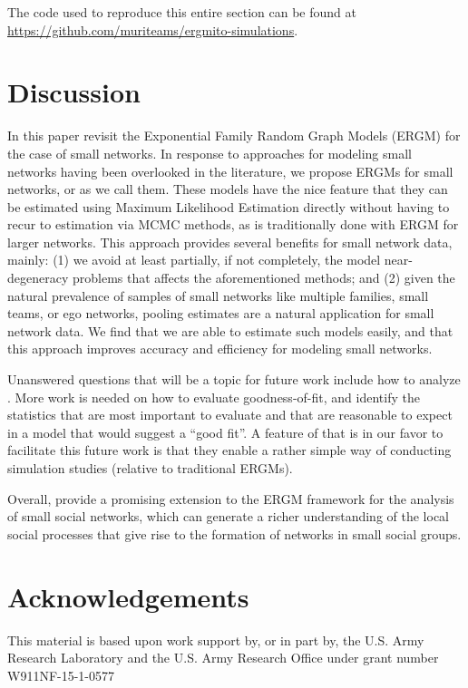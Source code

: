\documentclass[12pt]{article}
\begin{document}
The code used to reproduce this entire section can be found at \url{https://github.com/muriteams/ergmito-simulations}.

\pagebreak
\section{Discussion}

In this paper revisit the Exponential Family Random Graph Models (ERGM) for the case of small networks. In response to approaches for modeling small networks having been overlooked in the literature, we propose ERGMs for small networks, or \ergmitos{} as we call them. These models have the nice feature that they can be estimated using Maximum Likelihood Estimation directly without having to recur to estimation via MCMC methods, as is traditionally done with ERGM for larger networks. This approach provides several benefits for small network data, mainly: (1) we avoid at least partially, if not completely, the model near-degeneracy problems that affects the aforementioned methods; and (2) given the natural prevalence of samples of small networks like multiple families, small teams, or ego networks, pooling estimates are a natural application for small network data. We find that  we are able to estimate such models easily, and that this approach improves accuracy and efficiency for modeling small networks.

Unanswered questions that will be a topic for future work include how to analyze \ergmitos{}. More work is needed on how to evaluate goodness-of-fit, and identify the statistics that are most important to evaluate and that are reasonable to expect in a model that would suggest a ``good fit''. A feature of  \ergmitos{} that is in our favor to facilitate this future work is that they enable a rather simple way of conducting simulation studies (relative to traditional ERGMs).

Overall,  \ergmitos{} provide a promising extension to the ERGM framework for the analysis of small social networks, which can generate a richer understanding of the local social processes that give rise to the formation of networks in small social groups. 

\section{Acknowledgements}

This material is based upon work support by, or in part by, the U.S. Army Research Laboratory and the U.S. Army Research Office under grant number W911NF-15-1-0577
\end{document}
